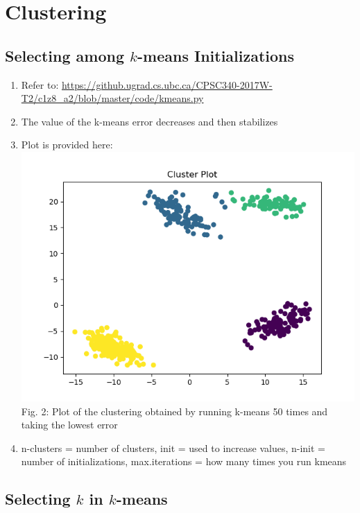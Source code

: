 \documentclass{article}
\def\enum#1{\begin{enumerate}#1\end{enumerate}}
\begin{document}
\section{Clustering}

\subsection{Selecting among $k$-means Initializations}

\enum{
 \item Refer to: \url{https://github.ugrad.cs.ubc.ca/CPSC340-2017W-T2/c1z8_a2/blob/master/code/kmeans.py}
 \item The value of the k-means error decreases and then stabilizes 
 \item Plot is provided here: \\
 \includegraphics[scale=0.6]{../figs/kmeans_lowest_error.png} \\ 
 Fig. 2: Plot of the clustering obtained by running k-means 50 times and taking the lowest error
 \item n-clusters = number of clusters, init = used to increase values, n-init = number of initializations, max.iterations = how many times you run kmeans 
 }


 \subsection{Selecting $k$ in $k$-means}
\end{document}
